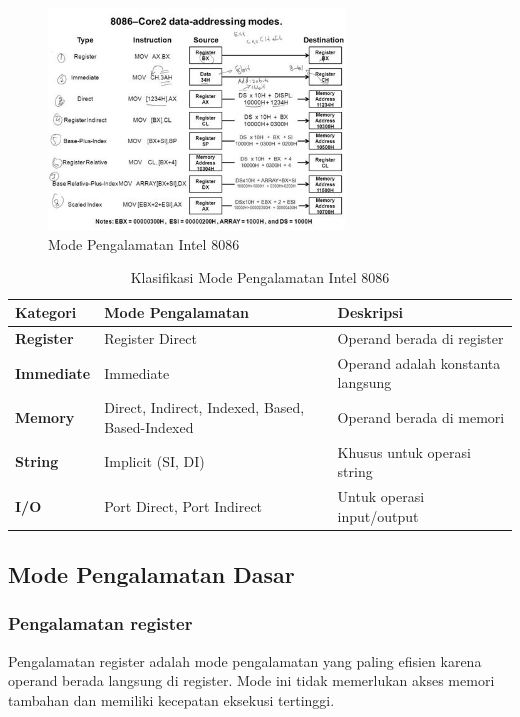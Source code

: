 \documentclass[../main.tex]{subfiles}
\begin{document}
        \begin{figure}[H]
            \centering
            \includegraphics[width=0.7\textwidth]{../images/8086_addressing_modes.jpg}
            \caption{Mode Pengalamatan Intel 8086}
            \label{fig:8086-addressing-modes}
        \end{figure}

        \begin{table}[H]
            \centering
            \caption{Klasifikasi Mode Pengalamatan Intel 8086}
            \begin{tabular}{|p{2.8cm}|p{4.5cm}|p{7cm}|}
\hline
\textbf{Kategori} & \textbf{Mode Pengalamatan} & \textbf{Deskripsi} \\
\hline
\textbf{Register} & Register Direct & Operand berada di register \\
\hline
\textbf{Immediate} & Immediate & Operand adalah konstanta langsung \\
\hline
\textbf{Memory} & Direct, Indirect, Indexed, Based, Based-Indexed & Operand berada di memori \\
\hline
\textbf{String} & Implicit (SI, DI) & Khusus untuk operasi string \\
\hline
\textbf{I/O} & Port Direct, Port Indirect & Untuk operasi input/output \\
\hline
            \end{tabular}
            \label{tab:addressing-modes-classification}
        \end{table}

        \subsection{Mode Pengalamatan Dasar}

            \subsubsection{Pengalamatan register}
Pengalamatan register adalah mode pengalamatan yang paling efisien karena operand berada langsung di register. Mode ini tidak memerlukan akses memori tambahan dan memiliki kecepatan eksekusi tertinggi.
\end{document}
